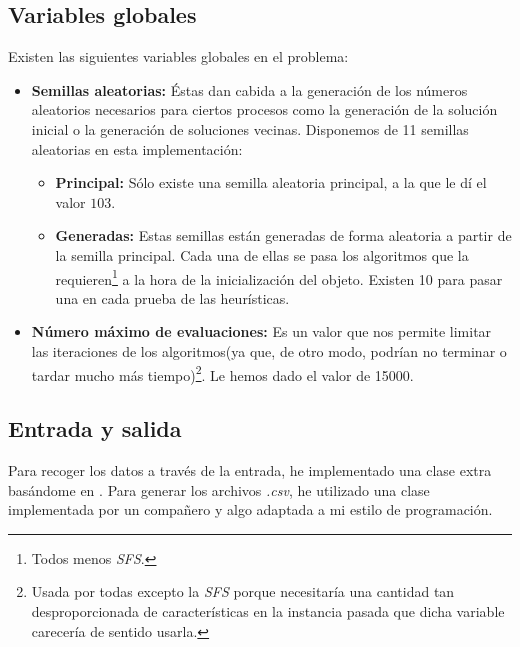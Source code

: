 	\subsection{Variables globales}
		Existen las siguientes variables globales en el problema:
		\begin{itemize}
			\item \textbf{Semillas aleatorias:} Éstas dan cabida a la generación de los números
			aleatorios necesarios para ciertos procesos como la generación de la solución inicial
			o la generación de soluciones vecinas. Disponemos de 11 semillas aleatorias en esta
			implementación:
				\begin{itemize}
					\item \textbf{Principal:} Sólo existe una semilla aleatoria principal, a la
					que le dí el valor $103$.
					\item \textbf{Generadas:} Estas semillas están generadas de forma aleatoria
					a partir de la semilla principal. Cada una de ellas se pasa los algoritmos
					que la requieren\footnote{Todos menos \textit{SFS}.} a la hora de la
					inicialización del objeto. Existen 10 para pasar una en cada prueba de las
					heurísticas.
				\end{itemize}
			\item \textbf{Número máximo de evaluaciones:} Es un valor que nos permite limitar
			las iteraciones de los algoritmos(ya que, de otro modo, podrían no terminar o tardar
			mucho más tiempo)\footnote{Usada por todas excepto la \textit{SFS} porque necesitaría
			una cantidad tan desproporcionada de características en la instancia pasada que
			dicha variable carecería de sentido usarla.}. Le hemos dado el valor de 15000.
		\end{itemize}
	
	\subsection{Entrada y salida}
		Para recoger los datos a través de la entrada, he implementado una clase extra basándome
		en \cite{ARFFReader}.
		Para generar los archivos \textit{.csv}, he utilizado una clase implementada por un
		compañero y algo adaptada a mi estilo de programación.
